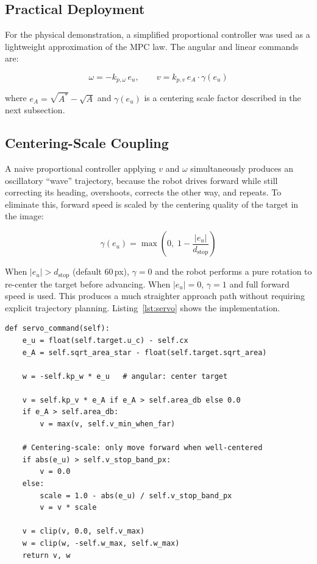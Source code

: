 \documentclass[journal, 10pt]{IEEEtran}
\begin{document}
\subsection{Practical Deployment}

For the physical demonstration, a simplified proportional controller was
used as a lightweight approximation of the MPC law. The angular and linear
commands are:

\begin{equation}
  \omega = -k_{p,\omega}\, e_u, \qquad v = k_{p,v}\, e_A \cdot \gamma(e_u)
\end{equation}

where $e_A = \sqrt{A^*} - \sqrt{A}$ and $\gamma(e_u)$ is a centering scale
factor described in the next subsection.

\subsection{Centering-Scale Coupling}
\label{subsec:coupling}

A naive proportional controller applying $v$ and $\omega$ simultaneously
produces an oscillatory ``wave'' trajectory, because the robot drives
forward while still correcting its heading, overshoots, corrects the other
way, and repeats. To eliminate this, forward speed is scaled by the
centering quality of the target in the image:

\begin{equation}
  \gamma(e_u) = \max\!\left(0,\; 1 - \frac{|e_u|}{d_{\text{stop}}}\right)
  \label{eq:scale}
\end{equation}

When $|e_u| > d_{\text{stop}}$ (default 60\,px), $\gamma = 0$ and the
robot performs a pure rotation to re-center the target before advancing.
When $|e_u| = 0$, $\gamma = 1$ and full forward speed is used. This
produces a much straighter approach path without requiring explicit
trajectory planning. Listing~\ref{lst:servo} shows the implementation.

\begin{lstlisting}[caption={Proportional servo command with centering-scale
    coupling.}, label={lst:servo}]
def servo_command(self):
    e_u = float(self.target.u_c) - self.cx
    e_A = self.sqrt_area_star - float(self.target.sqrt_area)

    w = -self.kp_w * e_u   # angular: center target

    v = self.kp_v * e_A if e_A > self.area_db else 0.0
    if e_A > self.area_db:
        v = max(v, self.v_min_when_far)

    # Centering-scale: only move forward when well-centered
    if abs(e_u) > self.v_stop_band_px:
        v = 0.0
    else:
        scale = 1.0 - abs(e_u) / self.v_stop_band_px
        v = v * scale

    v = clip(v, 0.0, self.v_max)
    w = clip(w, -self.w_max, self.w_max)
    return v, w
\end{lstlisting}
\end{document}
